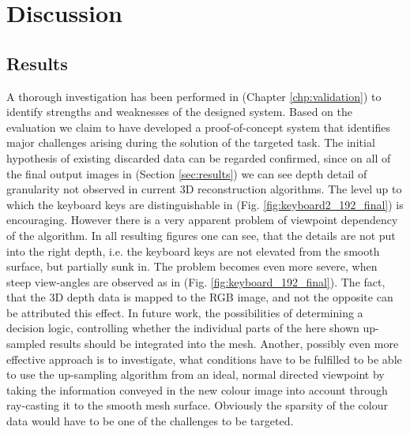 \documentclass{ucl_thesis}
\newcommand{\figref}[1]{(Fig. \ref{#1})}
\newcommand{\secref}[1]{(Section \ref{#1})}
\newcommand{\chpref}[1]{(Chapter \ref{#1})}
\begin{document}
\chapter{Discussion} 
\label{chp:discussion}

\section{Results}
\label{sec:discussion_results}

\par A thorough investigation has been performed in \chpref{chp:validation} to identify strengths and weaknesses of the designed system. Based on the evaluation we claim to have developed a proof-of-concept system that identifies major challenges arising during the solution of the targeted task. The initial hypothesis of existing discarded data can be regarded confirmed, since on all of the final output images in \secref{sec:results} we can see depth detail of granularity not observed in current 3D reconstruction algorithms. The level up to which the keyboard keys are  distinguishable in \figref{fig:keyboard2_192_final} is encouraging. However there is a very apparent problem of viewpoint dependency of the algorithm. In all resulting figures one can see, that the details are not put into the right depth, i.e. the keyboard keys are not elevated from the smooth surface, but partially sunk in. The problem becomes even more severe, when steep view-angles are observed as in \figref{fig:keyboard_192_final}. The fact, that the 3D depth data is mapped to the RGB image, and not the opposite can be attributed this effect. In future work, the possibilities of determining a decision logic, controlling whether the individual parts of the here shown up-sampled results should be integrated into the mesh. Another, possibly even more effective approach is to investigate, what conditions have to be fulfilled to be able to use the up-sampling algorithm from an ideal, normal directed viewpoint by taking the information conveyed in the new colour image into account through ray-casting it to the smooth mesh surface. Obviously the sparsity of the colour data would have to be one of the challenges to be targeted.
\end{document}
